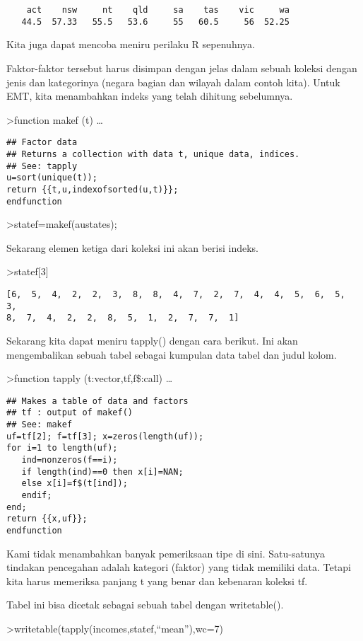 \documentclass[
]{book}
\begin{document}
\begin{verbatim}
    act    nsw     nt    qld     sa    tas    vic     wa
   44.5  57.33   55.5   53.6     55   60.5     56  52.25
\end{verbatim}

Kita juga dapat mencoba meniru perilaku R sepenuhnya.

Faktor-faktor tersebut harus disimpan dengan jelas dalam sebuah koleksi dengan jenis dan kategorinya (negara bagian dan wilayah dalam contoh kita). Untuk EMT, kita menambahkan indeks yang telah dihitung sebelumnya.

\textgreater function makef (t) \ldots{}

\begin{verbatim}
## Factor data
## Returns a collection with data t, unique data, indices.
## See: tapply
u=sort(unique(t));
return {{t,u,indexofsorted(u,t)}};
endfunction
\end{verbatim}

\textgreater statef=makef(austates);

Sekarang elemen ketiga dari koleksi ini akan berisi indeks.

\textgreater statef{[}3{]}

\begin{verbatim}
[6,  5,  4,  2,  2,  3,  8,  8,  4,  7,  2,  7,  4,  4,  5,  6,  5,  3,
8,  7,  4,  2,  2,  8,  5,  1,  2,  7,  7,  1]
\end{verbatim}

Sekarang kita dapat meniru tapply() dengan cara berikut. Ini akan mengembalikan sebuah tabel sebagai kumpulan data tabel dan judul kolom.

\textgreater function tapply (t:vector,tf,f\$:call) \ldots{}

\begin{verbatim}
## Makes a table of data and factors
## tf : output of makef()
## See: makef
uf=tf[2]; f=tf[3]; x=zeros(length(uf));
for i=1 to length(uf);
   ind=nonzeros(f==i);
   if length(ind)==0 then x[i]=NAN;
   else x[i]=f$(t[ind]);
   endif;
end;
return {{x,uf}};
endfunction
\end{verbatim}

Kami tidak menambahkan banyak pemeriksaan tipe di sini. Satu-satunya tindakan pencegahan adalah kategori (faktor) yang tidak memiliki data. Tetapi kita harus memeriksa panjang t yang benar dan kebenaran koleksi tf.

Tabel ini bisa dicetak sebagai sebuah tabel dengan writetable().

\textgreater writetable(tapply(incomes,statef,``mean''),wc=7)
\end{document}
